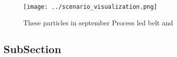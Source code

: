 \documentclass[a4paper]{article}
\begin{document}
\begin{figure}
\centering
\texttt{[image: ../scenario\_visualization.png]}
\caption{These particles in september Process led belt and
}
\end{figure}
 
\subsection{SubSection}
\end{document}
